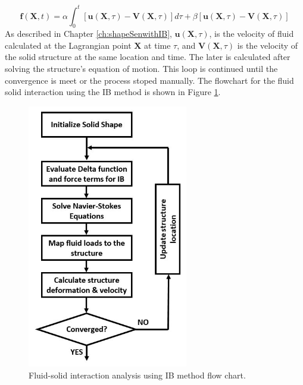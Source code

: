 %
\begin{equation}\label{eq:C5_immersedBoundaryForceTerm}
    \mathbf{f}(\mathbf{X}, t) = 
    \alpha \int_0^t \left[ \mathbf{u}(\mathbf{X}, \tau) - \mathbf{V}(\mathbf{X}, \tau) \right] d\tau + 
    \beta \left[ \mathbf{u}(\mathbf{X}, \tau) - \mathbf{V}(\mathbf{X}, \tau) \right]
\end{equation}
%
As described in Chapter \ref{ch:shapeSenwithIB}, $\mathbf{u}(\mathbf{X}, \tau)$, is the velocity of fluid calculated at the Lagrangian point $\mathbf{X}$ at time $\tau$, and $\mathbf{V}(\mathbf{X}, \tau)$ is the velocity of the solid structure at the same location and time. The later is calculated after solving the structure's equation of motion. This loop is continued until the convergence is meet or the process stoped manually. The flowchart for the fluid solid interaction using the IB method is shown in Figure \ref{fig:C5_FSIflowchart}.
%
\begin{figure}[H]
    \centering
    \includegraphics[width=7.00cm]{Chapter_5/figure/Chapter5_FSI_FlowChart.jpg}
    \caption{Fluid-solid interaction analysis using IB method flow chart.}
    \label{fig:C5_FSIflowchart}
\end{figure}
%